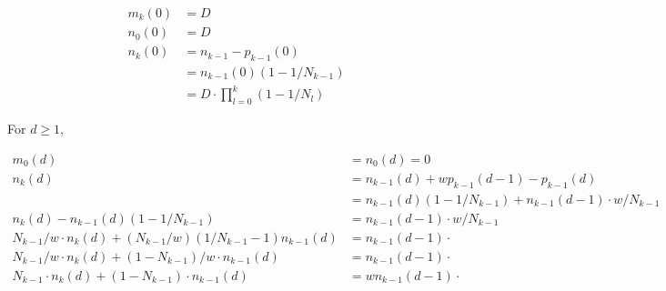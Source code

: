 \[
\begin{array}{rll}
 m_k(0) &= D\\
 n_0(0) &= D\\
 n_k(0) &= n_{k-1} -p_{k-1}(0)             \\
        &= n_{k-1}(0) (1-1/N_{k-1})        \\ 
        &= D\cdot \prod_{l=0}^k(1-1/N_l) 
\end{array}
\]

For $d\geq 1$,

\[
\begin{array}{rll}
 m_0(d) &=  n_0(d) = 0                         \\
 n_k(d) &= n_{k-1}(d)+wp_{k-1}(d-1)-p_{k-1}(d) \\
        &= n_{k-1}(d) (1-1/N_{k-1}) + n_{k-1}(d-1) \cdot w/N_{k-1}\\
 n_k(d) -  n_{k-1}(d) (1-1/N_{k-1}) &= n_{k-1}(d-1) \cdot w/N_{k-1}\\
 N_{k-1}/w \cdot n_k(d) + (N_{k-1}/w)(1/N_{k-1}-1) n_{k-1}(d) &= n_{k-1}(d-1) \cdot \\
 N_{k-1}/w \cdot n_k(d) + (1-N_{k-1})/w\cdot n_{k-1}(d) &= n_{k-1}(d-1) \cdot \\
 N_{k-1} \cdot n_k(d) + (1-N_{k-1})\cdot n_{k-1}(d) &= wn_{k-1}(d-1) \cdot \\
\end{array}
\]


% 
% 
% 








